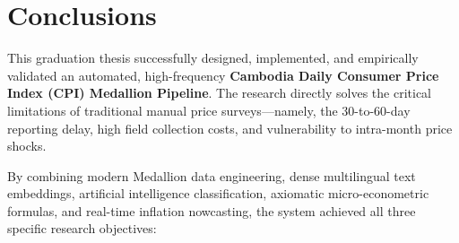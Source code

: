 
\section{Conclusions}
\hs This graduation thesis successfully designed, implemented, and empirically validated an automated, high-frequency \textbf{Cambodia Daily Consumer Price Index (CPI) Medallion Pipeline}. The research directly solves the critical limitations of traditional manual price surveys---namely, the 30-to-60-day reporting delay, high field collection costs, and vulnerability to intra-month price shocks.

\hs By combining modern Medallion data engineering, dense multilingual text embeddings, artificial intelligence classification, axiomatic micro-econometric formulas, and real-time inflation nowcasting, the system achieved all three specific research objectives:

